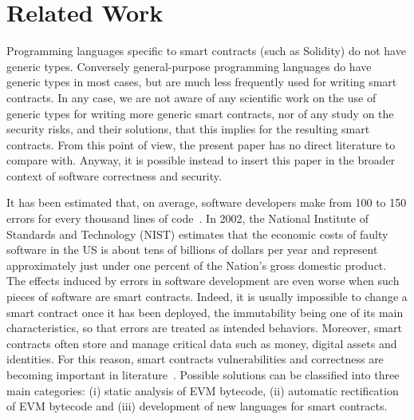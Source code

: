 \section{Related Work}\label{sec:related_work}

Programming languages specific to smart contracts (such as Solidity)
do not have generic types. Conversely general-purpose programming languages do have
generic types in most cases, but are much less frequently used for writing smart contracts.
In any case, we are not aware of any scientific work on the use of generic
types for writing more generic smart contracts, nor of any study on the security
risks, and their solutions, that this implies for the resulting smart contracts. From this point of view,
the present paper has no direct literature to compare with.
%
Anyway, it is possible instead to insert this paper in the broader context of software correctness and security.

It has been estimated that, on average, software developers make from 100 to 150 errors
for every thousand lines of code~\cite{software_engineering}.
In 2002, the National Institute of Standards and Technology (NIST) estimates that the economic
costs of faulty software in the US is about tens of billions of dollars per year and represent
approximately just under one percent of the Nation's gross domestic product.
The effects induced by errors in software development are even worse when such pieces of software
are smart contracts. Indeed, it is usually impossible to change a smart contract once
it has been deployed, the immutability being one of its main characteristics, so that
errors are treated as intended behaviors. Moreover, smart contracts often store and
manage critical data such as money, digital assets and identities. For this reason, smart contracts
vulnerabilities and correctness are becoming important in literature~\cite{smart_contracts_verification}. Possible solutions can be
classified into three main categories: (i) static analysis of EVM bytecode,
(ii) automatic rectification of EVM bytecode and (iii) development of new languages
for smart contracts.

